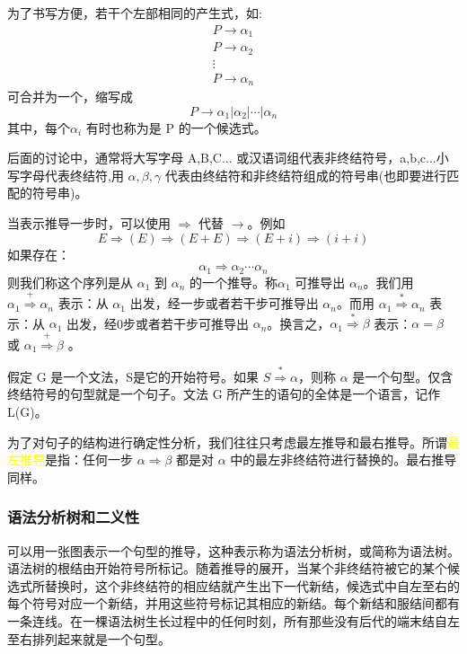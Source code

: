 为了书写方便，若干个左部相同的产生式，如:
\begin{equation}
    \begin{aligned}
        P \rightarrow \alpha_1 \\
        P \rightarrow \alpha_2 \\
        \vdots                 \\
        P \rightarrow \alpha_n \nonumber
    \end{aligned}
\end{equation}
可合并为一个，缩写成
\[ P \rightarrow \alpha_1 | \alpha_2 | \cdots | \alpha_n \]
其中，每个$\alpha_i$ 有时也称为是 P 的一个候选式。

后面的讨论中，通常将大写字母 A,B,C... 或汉语词组代表非终结符号，a,b,c...小写字母代表终结符,用 $\alpha,\beta,\gamma$ 代表由终结符和非终结符组成的符号串(也即要进行匹配的符号串)。

\textcolor{tip}{当表示推导一步时，可以使用 $\Rightarrow$ 代替 $\rightarrow$}。例如
\[ E \Rightarrow (E) \Rightarrow (E+E) \Rightarrow (E+i) \Rightarrow (i+i) \]
如果存在：
\[ \alpha_1 \Rightarrow \alpha_2 \cdots \alpha_n \]
则我们称这个序列是从 $\alpha_1$ 到 $\alpha_n$ 的一个推导。称$\alpha_1$ 可推导出 $\alpha_n$。我们用 $\alpha_1 \stackrel{+}{\Rightarrow} \alpha_n$ 表示：从 $\alpha_1$ 出发，\textcolor{tip}{经一步或者若干步}可推导出 $\alpha_n$。而用 $\alpha_1 \stackrel{*}{\Rightarrow} \alpha_n$ 表示：从 $\alpha_1$ 出发，\textcolor{tip}{经0步或者若干步}可推导出 $\alpha_n$。换言之，$\alpha_1 \stackrel{*}{\Rightarrow} \beta$ 表示：$\alpha = \beta$ 或 $\alpha_1 \stackrel{+}{\Rightarrow} \beta$ 。

假定 G 是一个文法，S是它的开始符号。如果 $S \stackrel{*}{\Rightarrow} \alpha$，则称 $\alpha$ 是一个句型。仅含终结符号的句型就是一个句子。文法 G 所产生的语句的全体是一个语言，记作 L(G)。

为了对句子的结构进行确定性分析，我们往往只考虑最左推导和最右推导。所谓\textcolor{mark}{最左推导}是指：任何一步 $\alpha \Rightarrow \beta$ 都是对 $\alpha$ 中的最左非终结符进行替换的。最右推导同样。

\subsubsection{语法分析树和二义性}

可以用一张图表示一个句型的推导，这种表示称为语法分析树，或简称为语法树。语法树的根结由开始符号所标记。随着推导的展开，当某个非终结符被它的某个候选式所替换时，这个非终结符的相应结就产生出下一代新结，候选式中自左至右的每个符号对应一个新结，并用这些符号标记其相应的新结。每个新结和服结间都有一条连线。在一棵语法树生长过程中的任何时刻，所有那些没有后代的端末结自左至右排列起来就是一个句型。

